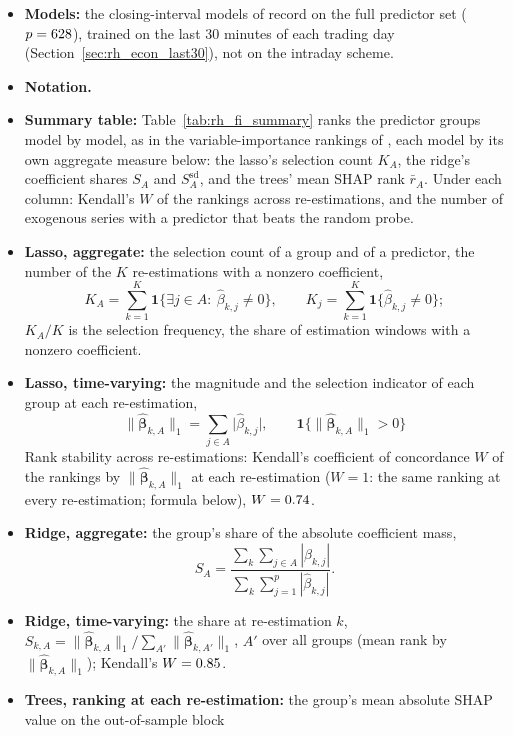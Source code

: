 \begin{itemize}
\item \textbf{Models:} the closing-interval models of record on the full predictor set ($p = 628$), trained on
  the last 30 minutes of each trading day (Section~\ref{sec:rh_econ_last30}), not on the intraday scheme.
\item \textbf{Notation.}
\item \textbf{Summary table:} Table~\ref{tab:rh_fi_summary} ranks the predictor groups model by model, as in the
  variable-importance rankings of \citet{gu2020empirical}, each model by its own aggregate measure below: the lasso's
  selection count $K_A$, the ridge's coefficient shares $S_A$ and $S^{\mathrm{sd}}_A$, and the trees' mean SHAP rank
  $\bar r_A$. Under each column: Kendall's $W$ of the rankings across re-estimations, and the number of exogenous
  series with a predictor that beats the random probe.

\item \textbf{Lasso, aggregate:} the selection count of a group and of a predictor, the number of the $K$
  re-estimations with a nonzero coefficient,
  \[
    K_A = \sum_{k=1}^{K} \mathbf{1}\bigl\{\exists j \in A:\ \hat\beta_{k,j} \ne 0\bigr\}, \qquad
    K_j = \sum_{k=1}^{K} \mathbf{1}\bigl\{\hat\beta_{k,j} \ne 0\bigr\};
  \]
  $K_A / K$ is the selection frequency, the share of estimation windows with a nonzero coefficient.
\item \textbf{Lasso, time-varying:} the magnitude and the selection indicator of each group at each re-estimation,
  \[
    \lVert\hat{\bm\beta}_{k,A}\rVert_1 = \sum_{j \in A} \bigl|\hat\beta_{k,j}\bigr|, \qquad
    \mathbf{1}\bigl\{\lVert\hat{\bm\beta}_{k,A}\rVert_1 > 0\bigr\}
  \]
  Rank stability across re-estimations: Kendall's coefficient of
  concordance $W$ of the rankings by $\lVert\hat{\bm\beta}_{k,A}\rVert_1$ at each re-estimation ($W = 1$: the same
  ranking at every re-estimation; formula below), $W = 0.74$.
\item \textbf{Ridge, aggregate:} the group's share of the absolute coefficient mass,
  \[
    S_A = \frac{\sum_{k} \sum_{j \in A} |\hat\beta_{k,j}|}{\sum_{k} \sum_{j=1}^{p} |\hat\beta_{k,j}|} .
  \]
\item \textbf{Ridge, time-varying:} the share at re-estimation $k$,
  $S_{k,A} = \lVert\hat{\bm\beta}_{k,A}\rVert_1 / \sum_{A'} \lVert\hat{\bm\beta}_{k,A'}\rVert_1$, $A'$ over all groups
  (mean rank by $\lVert\hat{\bm\beta}_{k,A}\rVert_1$); Kendall's
  $W = 0.85$.
\item \textbf{Trees, ranking at each re-estimation:} the group's mean absolute SHAP value on the out-of-sample block

\end{itemize}

